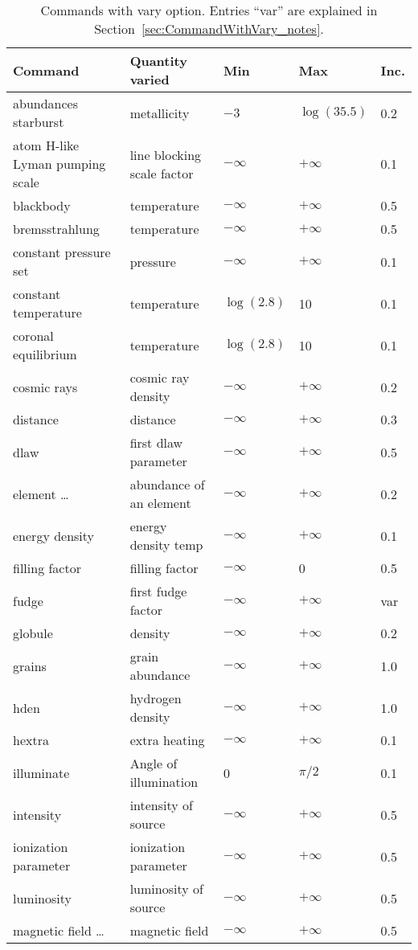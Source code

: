 \begin{table}
\centering
\label{tab:CommandWithVaryOption}
\caption{Commands with vary option. Entries ``var'' are explained in Section~\ref{sec:CommandWithVary_notes}.}
\begin{tabular}{lllll}
\hline
Command& Quantity varied& Min& Max& Inc.\\
\hline
abundances starburst& metallicity& $-3$& $\log(35.5)$& 0.2\\
atom H-like Lyman pumping scale & line blocking scale factor& $-\infty$& $+\infty$& 0.1\\
blackbody& temperature& $-\infty$& $+\infty$& 0.5\\
bremsstrahlung& temperature& $-\infty$& $+\infty$& 0.5\\
constant pressure set& pressure& $-\infty$& $+\infty$& 0.1\\
constant temperature& temperature& $\log(2.8)$& 10& 0.1\\
coronal equilibrium& temperature& $\log(2.8)$& 10& 0.1\\
cosmic rays& cosmic ray density& $-\infty$& $+\infty$& 0.2\\
distance& distance& $-\infty$& $+\infty$& 0.3\\
dlaw& first dlaw parameter& $-\infty$& $+\infty$& 0.5\\
element \ldots& abundance of an element& $-\infty$& $+\infty$& 0.2\\
energy density& energy density temp& $-\infty$& $+\infty$& 0.1\\
filling factor& filling factor& $-\infty$& 0& 0.5\\
fudge& first fudge factor& $-\infty$& $+\infty$& var\\
globule& density& $-\infty$& $+\infty$& 0.2\\
grains& grain abundance& $-\infty$& $+\infty$& 1.0\\
hden& hydrogen density& $-\infty$& $+\infty$& 1.0\\
hextra& extra heating& $-\infty$& $+\infty$& 0.1\\
illuminate& Angle of illumination& 0& $\pi/2$& 0.1\\
intensity& intensity of source& $-\infty$& $+\infty$& 0.5\\
ionization parameter& ionization parameter& $-\infty$& $+\infty$& 0.5\\
luminosity& luminosity of source& $-\infty$& $+\infty$& 0.5\\
magnetic field \ldots& magnetic field& $-\infty$& $+\infty$& 0.5\\

\end{tabular}
\end{table}
